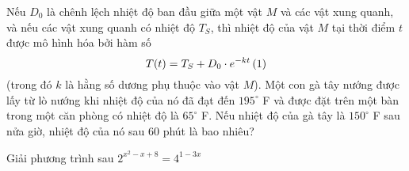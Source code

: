 \begin{bt}%
	Nếu $D_0$ là chênh lệch nhiệt độ ban đầu giữa một vật $M$ và các vật xung quanh, và nếu các vật xung quanh có nhiệt độ $T_S$, thì nhiệt độ của vật $M$ tại thời điểm $t$ được mô hình hóa bởi hàm số
	$$T(t)=T_S+D_0 \cdot e^{-k t}\, \hfill{(1)}$$ (trong đó $k$ là hằng số dương phụ thuộc vào vật $M$). Một con gà tây nướng được lấy từ lò nướng khi nhiệt độ của nó đã đạt đến $195^{\circ}$ F và được đặt trên một bàn trong một căn phòng có nhiệt độ là $65^{\circ}$ F. Nếu nhiệt độ của gà tây là $150^{\circ}$ F sau nửa giờ, nhiệt độ của nó sau $60$ phút là bao nhiêu?
\end{bt}
\begin{bt}%
	Giải phương trình sau  $2^{x^2-x+8}=4^{1-3 x}$
\end{bt}
